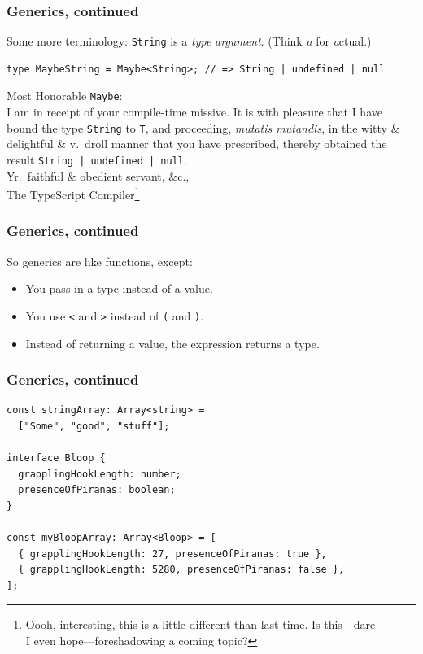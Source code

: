 \documentclass[aspectratio=169]{beamer}
\begin{document}
\begin{frame}[fragile]
  \frametitle{Generics, continued}
  \small

  Some more terminology: \texttt{String} is a \emph{type} \textit{argument}.
  (Think \textit{a} for \textit{a}ctual.)

  \vspace{1em}

  \footnotesize
  \begin{verbatim}
type MaybeString = Maybe<String>; // => String | undefined | null
  \end{verbatim}
  \small

  \vspace{1em}

  \begin{tcolorbox}
    Most Honorable \texttt{Maybe}: \\

    I am in receipt of your compile-time missive. It is with pleasure that
    I have bound the type \texttt{String} to \texttt{T}, and proceeding,
    \textit{mutatis mutandis}, in the witty \& delightful \& v.\ droll manner
    that you have prescribed, thereby obtained the result
    \texttt{String | undefined | null}. \\

    Yr.\ faithful \& obedient servant, \&c., \\
    The TypeScript Compiler\footnote{Oooh, interesting, this is a little
      different than last time. Is this---dare \\ I even hope---foreshadowing
      a coming topic?}
  \end{tcolorbox}
\end{frame}

\begin{frame}
  \frametitle{Generics, continued}

  So generics are like functions, except: \\

  \begin{itemize}
    \item You pass in a type instead of a value.
    \item You use \texttt{<} and \texttt{>} instead of \texttt{(} and
          \texttt{)}.
    \item Instead of returning a value, the expression returns a type.
  \end{itemize}
\end{frame}

\begin{frame}[fragile]
  \frametitle{Generics, continued}

  \begin{verbatim}
const stringArray: Array<string> =
  ["Some", "good", "stuff"];

interface Bloop {
  grapplingHookLength: number;
  presenceOfPiranas: boolean;
}

const myBloopArray: Array<Bloop> = [
  { grapplingHookLength: 27, presenceOfPiranas: true },
  { grapplingHookLength: 5280, presenceOfPiranas: false },
];
  \end{verbatim}
\end{frame}
\end{document}
